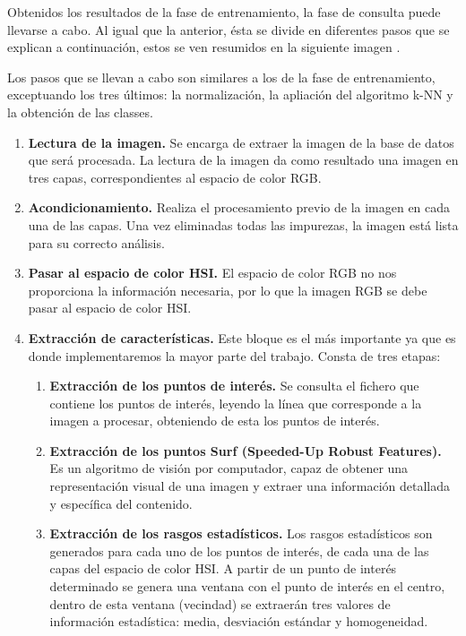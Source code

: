 Obtenidos los resultados de la fase de entrenamiento, la fase de consulta puede llevarse a cabo. Al igual que la anterior, \'esta se divide en diferentes pasos que se explican a continuación, estos se ven resumidos en la siguiente imagen .


Los pasos que se llevan a cabo son similares a los de la fase de entrenamiento, exceptuando los tres \'ultimos: la normalización, la apliaci\'on del algoritmo k-NN y la obtenci\'on de las classes.

\begin{enumerate}
	\item \textbf{Lectura de la imagen.} Se encarga de extraer la imagen de la base de datos que ser\'a procesada. La lectura de la imagen da como resultado una imagen en tres capas, correspondientes al espacio de color RGB.
	\item \textbf{Acondicionamiento.} Realiza el procesamiento previo de la imagen en cada una de las capas. Una vez eliminadas todas las impurezas, la imagen est\'a lista para su correcto an\'alisis.
	\item \textbf{Pasar al espacio de color HSI.} El espacio de color RGB no nos proporciona la informaci\'on necesaria, por lo que la imagen RGB se debe pasar al espacio de color HSI.
	\item \textbf{Extracci\'on de caracter\'isticas.} Este bloque es el m\'as importante ya que es donde implementaremos la mayor parte del trabajo. Consta de tres etapas:
		\begin{enumerate}
		\item \textbf{Extracci\'on de los puntos de inter\'es.} Se consulta el fichero que contiene los puntos de inter\'es, leyendo la l\'inea que corresponde a la imagen a procesar, obteniendo de esta los puntos de inter\'es.
		\item \textbf{Extracci\'on de los puntos Surf (Speeded-Up Robust Features).} Es un algoritmo de visi\'on por computador, capaz de obtener una representaci\'on visual de una imagen y extraer una informaci\'on detallada y espec\'ifica del contenido. 
		\item \textbf{Extracci\'on de los rasgos estad\'isticos.} Los rasgos estad\'isticos son generados para cada uno de los puntos de inter\'es, de cada una de las capas del espacio de color HSI. A partir de un punto de inter\'es determinado se genera una ventana con el punto de inter\'es en el centro, dentro de esta ventana (vecindad) se extraer\'an tres valores de informaci\'on estad\'istica: media, desviaci\'on est\'andar y homogeneidad.

\end{enumerate}
\end{enumerate}
